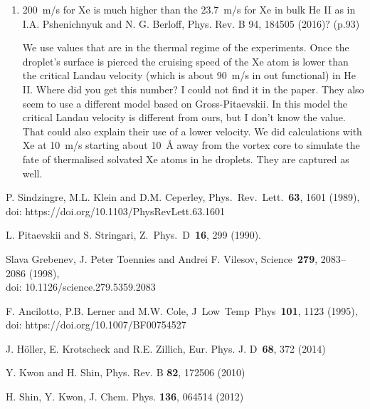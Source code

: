 \documentclass[11pt]{revtex4-1}
\newenvironment{QandA}{\begin{enumerate}[label=\bfseries\arabic*)]\bfseries}
                      {\end{enumerate}}
\newenvironment{answered}{\par\normalfont}{}
\begin{document}
\begin{QandA}
		\item 200~m/s for Xe is much higher than the 23.7~m/s for Xe in bulk He II as in I.A. Pshenichnyuk and N. G. Berloff, Phys. Rev. B 94, 184505 (2016)? (p.93)
		\begin{answered}
			 We use values that are in the thermal regime of the experiments. Once the droplet's surface is pierced the cruising speed of the Xe atom is lower than the critical Landau velocity (which is about 90~m/s in out functional) in He II. Where did you get this number? I could not find it in the paper. They also seem to use a different model based on Gross-Pitaevskii. In this model the critical Landau velocity is different from ours, but I don't know the value. That could also explain their use of a lower velocity. We did calculations with Xe at 10~m/s starting about 10~\AA{} away from the vortex core to simulate the fate of thermalised solvated Xe atoms in he droplets. They are captured as well.	
		\end{answered}

	\end{QandA}
	
	\begin{thebibliography}{9}	
			P. Sindzingre, M.L. Klein and D.M. Ceperley,
			Phys.~Rev.~Lett.~\textbf{63}, 1601
			(1989),\\
			doi: https://doi.org/10.1103/PhysRevLett.63.1601

			L. Pitaevskii and S. Stringari,
			Z.~Phys.~D~\textbf{16}, 299
			(1990).

			Slava Grebenev, J. Peter Toennies and Andrei F. Vilesov,
			Science~\textbf{279}, 2083--2086
			(1998),\\
			doi: 10.1126/science.279.5359.2083

			F. Ancilotto, P.B. Lerner and M.W. Cole,
			J~Low~Temp~Phys~\textbf{101}, 1123
			(1995),\\
			doi: https://doi.org/10.1007/BF00754527

			J. Höller, E. Krotscheck and R.E. Zillich,
			Eur. Phys. J. D~\textbf{68}, 372
			(2014)
		
			Y. Kwon and H. Shin,
			Phys. Rev. B \textbf{82}, 172506
			(2010)
			
			H. Shin, Y. Kwon,
			J. Chem. Phys. \textbf{136}, 064514
			(2012) 
	\end{thebibliography}
	
\end{document}
